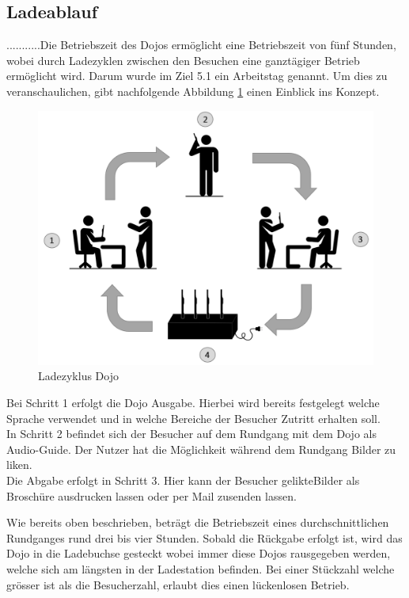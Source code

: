 \subsection{Ladeablauf}\label{sec:ladeablauf}

...........Die Betriebszeit des Dojos ermöglicht eine Betriebszeit von fünf Stunden, wobei durch Ladezyklen zwischen den Besuchen eine ganztägiger Betrieb ermöglicht wird. Darum wurde im Ziel 5.1 ein Arbeitstag genannt. Um dies zu veranschaulichen, gibt nachfolgende Abbildung \ref{fig:Ladezyklus Dojo} einen Einblick ins Konzept.

\begin{figure}[H]
	\begin{center}
		\includegraphics[width=140mm]{data/Ladezyklus2.png}
		\caption[Ladezyklus Dojo]{Ladezyklus Dojo} %
		\label{fig:Ladezyklus Dojo}
	\end{center}
\end{figure}

Bei Schritt 1 erfolgt die Dojo Ausgabe. Hierbei wird bereits festgelegt welche Sprache verwendet und in welche Bereiche der Besucher Zutritt erhalten soll.
\\
In Schritt 2 befindet sich der Besucher auf dem Rundgang mit dem Dojo als Audio-Guide. Der Nutzer hat die Möglichkeit während dem Rundgang Bilder zu \glqq liken\grqq .
\\
Die Abgabe erfolgt in Schritt 3. Hier kann der Besucher \glqq gelikte\grqq Bilder als Broschüre ausdrucken lassen oder per Mail zusenden lassen.


Wie bereits oben beschrieben, beträgt die Betriebszeit eines durchschnittlichen Rundganges rund drei bis vier Stunden. Sobald die Rückgabe erfolgt ist, wird das Dojo in die Ladebuchse gesteckt wobei immer diese Dojos rausgegeben werden, welche sich am längsten in der Ladestation befinden. Bei einer Stückzahl welche grösser ist als die Besucherzahl, erlaubt dies einen lückenlosen Betrieb.
\cite{Plank}
